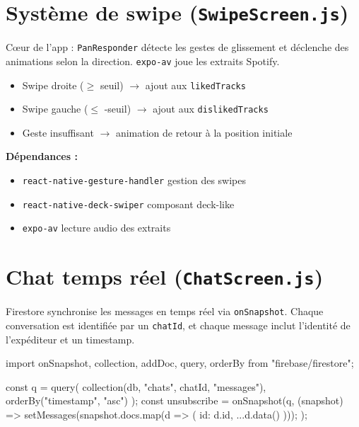 \documentclass[11pt,a4paper]{article}
\begin{document}
\section{Système de swipe (\texttt{SwipeScreen.js})}

Cœur de l'app : \texttt{PanResponder} détecte les gestes de glissement et déclenche des animations selon la direction. \texttt{expo-av} joue les extraits Spotify.

\begin{stepbox}[title={\faHandPointer~Logique de geste}]
\begin{itemize}
  \item Swipe droite ($\geq$ seuil) $\rightarrow$ ajout aux \texttt{likedTracks}
  \item Swipe gauche ($\leq$ -seuil) $\rightarrow$ ajout aux \texttt{dislikedTracks}
  \item Geste insuffisant $\rightarrow$ animation de retour à la position initiale
\end{itemize}
\end{stepbox}

\textbf{Dépendances :}
\begin{itemize}
  \item \texttt{react-native-gesture-handler} \textemdash{} gestion des swipes
  \item \texttt{react-native-deck-swiper} \textemdash{} composant deck-like
  \item \texttt{expo-av} \textemdash{} lecture audio des extraits
\end{itemize}

\section{Chat temps réel (\texttt{ChatScreen.js})}

Firestore synchronise les messages en temps réel via \texttt{onSnapshot}. Chaque conversation est identifiée par un \texttt{chatId}, et chaque message inclut l'identité de l'expéditeur et un timestamp.

\begin{codebox}
import { onSnapshot, collection, addDoc, query, orderBy } from "firebase/firestore";

const q = query(
  collection(db, "chats", chatId, "messages"),
  orderBy("timestamp", "asc")
);
const unsubscribe = onSnapshot(q, (snapshot) => {
  setMessages(snapshot.docs.map(d => ({ id: d.id, ...d.data() })));
});
\end{codebox}
\end{document}
